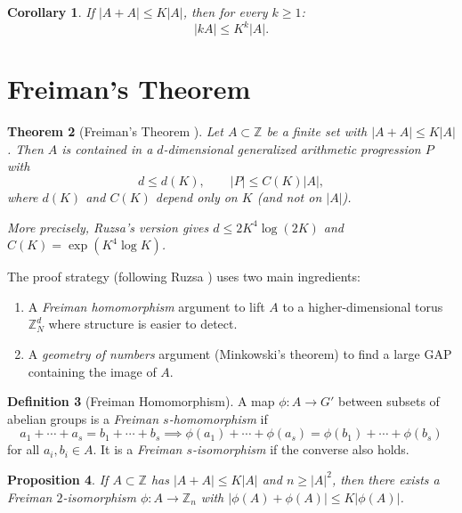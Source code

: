 \documentclass[12pt,a4paper]{amsart}
\newtheorem{theorem}{Theorem}[section]
\newtheorem{corollary}[theorem]{Corollary}
\newtheorem{proposition}[theorem]{Proposition}
\theoremstyle{definition}
\newtheorem{definition}[theorem]{Definition}
\theoremstyle{remark}
\newcommand{\Z}{\mathbb{Z}}
\begin{document}
\begin{corollary}\label{cor:plunnecke_sumset}
If $|A + A| \leq K|A|$, then for every $k \geq 1$:
\[
  |kA| \leq K^k |A|.
\]
\end{corollary}

\section{Freiman's Theorem}\label{sec:freiman}

\begin{theorem}[Freiman's Theorem \cite{Freiman1966,Ruzsa1994}]\label{thm:freiman}
Let $A \subset \Z$ be a finite set with $|A + A| \leq K|A|$. Then $A$ is contained
in a $d$-dimensional generalized arithmetic progression $P$ with
\[
  d \leq d(K), \qquad |P| \leq C(K) |A|,
\]
where $d(K)$ and $C(K)$ depend only on $K$ (and not on $|A|$).

More precisely, Ruzsa's version \cite{Ruzsa1994} gives
$d \leq 2K^4 \log(2K)$
and $C(K) = \exp(K^4 \log K)$.
\end{theorem}

The proof strategy (following Ruzsa \cite{Ruzsa1994}) uses two main ingredients:
\begin{enumerate}[label=(\roman*)]
  \item A \emph{Freiman homomorphism} argument to lift $A$ to a higher-dimensional
        torus $\Z_N^d$ where structure is easier to detect.
  \item A \emph{geometry of numbers} argument (Minkowski's theorem) to find a
        large GAP containing the image of $A$.
\end{enumerate}

\begin{definition}[Freiman Homomorphism]
A map $\phi: A \to G'$ between subsets of abelian groups is a
\emph{Freiman $s$-homomorphism} if
\[
  a_1 + \cdots + a_s = b_1 + \cdots + b_s \implies
  \phi(a_1) + \cdots + \phi(a_s) = \phi(b_1) + \cdots + \phi(b_s)
\]
for all $a_i, b_i \in A$. It is a \emph{Freiman $s$-isomorphism} if the converse
also holds.
\end{definition}

\begin{proposition}\label{prop:freiman_iso}
If $A \subset \Z$ has $|A + A| \leq K|A|$ and $n \geq |A|^2$, then there exists
a Freiman $2$-isomorphism $\phi: A \to \Z_n$ with $|\phi(A) + \phi(A)| \leq K|\phi(A)|$.
\end{proposition}
\end{document}
